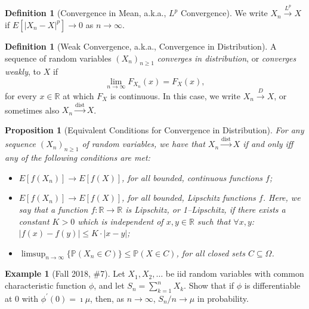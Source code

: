 \documentclass[12pt,reqno]{article}
\renewcommand{\emph}[1]{\textit{#1}}
\theoremstyle{plain}
\newtheorem{prop}[theorem]{Proposition}
\theoremstyle{definition}
\newtheorem{definition}[theorem]{Definition}
\newtheorem{example}[theorem]{Example}
\newcommand{\PP}[1]{\ensuremath{\mathbb{P}\left(#1\right)}}
\begin{document}
\begin{definition}[Convergence in Mean, a.k.a., $L^p$ Convergence]
We write $X_n \xrightarrow{L^p} X$ if $E[|X_n-X|^p] \rightarrow 0$ as 
$n \rightarrow \infty$. 
\end{definition} 

\begin{definition}[Weak Convergence, a.k.a., Convergence in Distribution]
A sequence of random variables $(X_n)_{n \geq 1}$ 
\emph{converges in distribution}, or \emph{converges weakly}, to $X$ if 
\[
\lim_{n \rightarrow \infty} F_{X_n}(x) = F_X(x), 
\]
for every $x \in \mathbb{R}$ at which $F_X$ is continuous. 
In this case, we write $X_n \xrightarrow{D} X$, or sometimes also 
$X_n \xrightarrow{\operatorname{dist}} X$. 
\end{definition} 

\begin{prop}[Equivalent Conditions for Convergence in Distribution]
For any sequence $(X_n)_{n \geq 1}$ of random variables, we have that 
$X_n \xrightarrow{\operatorname{dist}} X$ if and only iff any of the 
following conditions are met:
\begin{itemize} 

\item[(a)] $E[f(X_n)] \longrightarrow E[f(X)]$, for all bounded, continuous 
     functions $f$; 
\item[(b)] $E[f(X_n)] \longrightarrow E[f(X)]$, for all bounded, Lipschitz 
     functions $f$. Here, we say that a function $f: \mathbb{R} \rightarrow \mathbb{R}$ is 
     \emph{Lipschitz}, or \emph{1--Lipschitz}, if there exists a constant $K > 0$ which 
     is independent of $x,y \in \mathbb{R}$ such that $\forall x,y$: 
     $|f(x)-f(y)| \leq K \cdot |x-y|$; 
\item[(c)] $\limsup_{n \rightarrow \infty} \{\PP{X_n \in C}\} \leq \PP{X \in C}$, for all 
     closed sets $C \subseteq \Omega$. 

\end{itemize} 
\end{prop} 

\begin{example}[Fall 2018, \#7]
Let $X_1,X_2,\ldots$ be iid random variables with common characteristic 
function $\phi$, and let $S_n = \sum_{k=1}^n X_k$. Show that if $\phi$ is 
differentiable at $0$ with $\phi^{\prime}(0) = \imath\mu$, then, as 
$n \rightarrow \infty$, $S_n / n \rightarrow \mu$ in probability. 
\end{example} 
\end{document}
